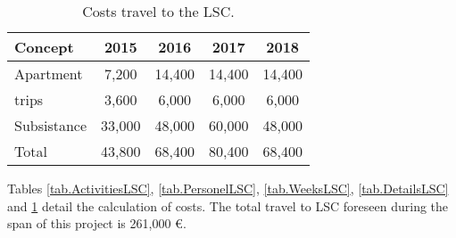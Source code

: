 \begin{table}[h!]
\begin{center}
\begin{tabular}{|l|c|c|c|c|}
\hline	
Concept &	2015 &	2016 &	2017 &	2018\\
\hline						
Apartment	 & 7,200 &	14,400 &	14,400 &14,400 \\
trips	& 3,600 &	6,000 &	6,000 &	6,000 \\
Subsistance &	33,000 &	48,000	& 60,000 & 48,000 \\
Total &	43,800 &	68,400 &	80,400 &	68,400 \\				
\hline						
\end{tabular}  
\caption{Costs travel to the LSC.}
\label{tab.CostsLSC}
\end{center}
\end{table}

Tables \ref{tab.ActivitiesLSC}, \ref{tab.PersonelLSC},  
\ref{tab.WeeksLSC}, \ref{tab.DetailsLSC} and  \ref{tab.CostsLSC} detail the calculation of costs. The total travel to LSC foreseen during the span of this project is 261,000 \euro.


